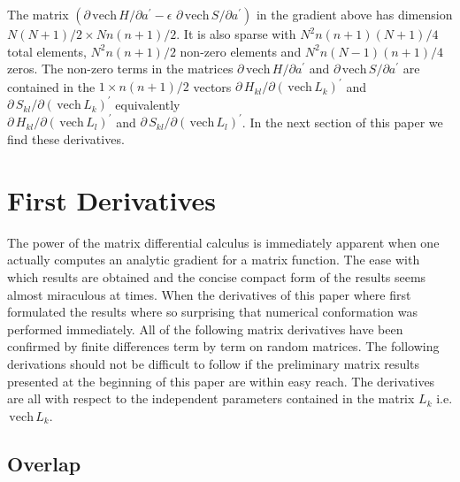 \documentclass[12pt,thmsa,suthesis,verbatim]{report}
\begin{document}
The matrix $\left( \partial \,\mathrm{vech}\,H/\partial a^{\prime }-\epsilon
\,\,\partial \,\mathrm{vech}\,S/\partial a^{\prime }\right) $ in the
gradient above has dimension $N\left( N+1\right) /2\times Nn\left(
n+1\right) /2$. It is also sparse with $N^2n\left( n+1\right) \left(
N+1\right) /4$ total elements, $N^2n\left( n+1\right) /2$ non-zero elements
and $N^2n\left( N-1\right) \left( n+1\right) /4$ zeros. The non-zero terms
in the matrices $\partial \,\mathrm{vech}\,H/\partial a^{\prime }$ and $%
\partial \,\mathrm{vech}\,S/\partial a^{\prime }$ are contained in the $%
1\times n\left( n+1\right) /2$ vectors $\partial \,H_{kl}/\partial \left( \,%
\mathrm{vech}\,L_k\right) ^{\prime }$ and $\partial \,S_{kl}/\partial \left(
\,\mathrm{vech}\,L_k\right) ^{\prime }$ equivalently \\$\partial
\,H_{kl}/\partial \left( \,\mathrm{vech}\,L_l\right) ^{\prime }$ and $%
\partial \,S_{kl}/\partial \left( \,\mathrm{vech}\,L_l\right) ^{\prime }$.
In the next section of this paper we find these derivatives.

\section{First Derivatives}

The power of the matrix differential calculus is immediately apparent when
one actually computes an analytic gradient for a matrix function. The ease
with which results are obtained and the concise compact form of the results
seems almost miraculous at times. When the derivatives of this paper where
first formulated the results where so surprising that numerical conformation
was performed immediately. All of the following matrix derivatives have been
confirmed by finite differences term by term on random matrices. The
following derivations should not be difficult to follow if the preliminary
matrix results presented at the beginning of this paper are within easy
reach. The derivatives are all with respect to the independent parameters
contained in the matrix $L_k$ i.e. $\,\mathrm{vech}\,L_k$.

\subsection{Overlap}
\end{document}
